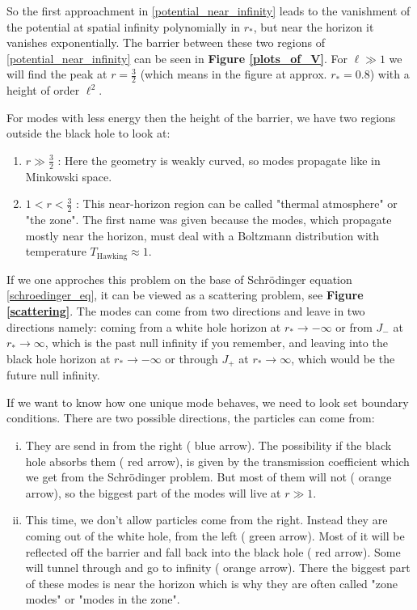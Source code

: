 	So the first approachment in \eqref{potential_near_infinity} leads to the vanishment of the potential at spatial infinity polynomially in $r_*$, but near the horizon it vanishes exponentially.
	The barrier between these two regions of \eqref{potential_near_infinity} can be seen in \textbf{Figure \ref{plots_of_V}}. For $\ell \gg 1$ we will find the peak at $r = \frac{3}{2}$ (which means in the figure at approx. $r_*= 0.8$) with a height of order $\ell^2$.
	
	For modes with less energy then the height of the barrier, we have two regions outside the black hole to look at: 
	\begin{enumerate}[1.)]
		\item $r \gg \frac{3}{2}$ : Here the geometry is weakly curved, so modes propagate like in Minkowski space.
		\item $1 < r < \frac{3}{2}$ : This near-horizon region can be called "thermal atmosphere" or "the zone". The first name was given because the modes, which propagate mostly near the horizon, must deal with a Boltzmann distribution with temperature $T_{\text{Hawking}} \approx 1$.  
	\end{enumerate} 	
	If we one approches this problem on the base of Schrödinger equation \eqref{schroedinger_eq}, it can be viewed as a scattering problem, see \textbf{Figure \ref{scattering}}. The modes can come from two directions and leave in two directions namely: coming from a white hole horizon at $r_*\rightarrow -\infty$ or from $J_-$ at $r_*\rightarrow \infty$, which is the past null infinity if you remember, and leaving into the black hole horizon at $r_* \rightarrow -\infty$ or through $J_+$ at $r_* \rightarrow \infty$, which would be the future null infinity.
	
	If we want to know how one unique mode behaves, we need to look set boundary conditions. There are two possible directions, the particles can come from:
	\begin{enumerate}[(i)]
		\item They are send in from the right ({\color{blue} blue} arrow). The possibility if the black hole absorbs them ({\color{red} red} arrow), is given by the transmission coefficient which we get from the Schrödinger problem. But most of them will not ({\color{orange} orange} arrow), so the biggest part of the modes will live at $r \gg 1$.
		\item This time, we don't allow particles come from the right. Instead they are coming out of the white hole, from the left ({\color{forestgreen} green} arrow). Most of it will be reflected off the barrier and fall back into the black hole ({\color{red} red} arrow). Some will tunnel through and go to infinity ({\color{orange} orange} arrow). There the biggest part of these modes is near the horizon which is why they are often called "zone modes" or "modes in the zone".
	\end{enumerate} 
	
